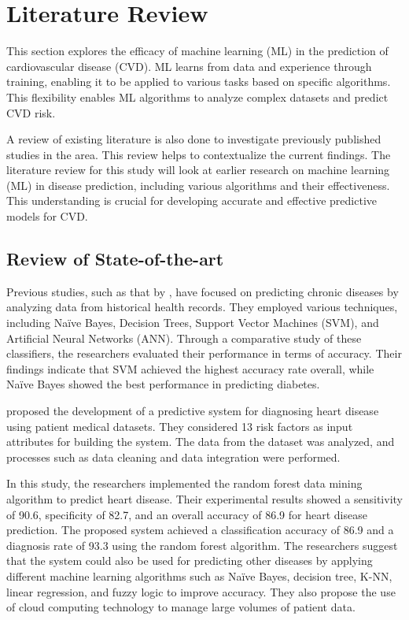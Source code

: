 \chapter{Literature Review}
\label{ch:lit_rev} %

This section explores the efficacy of machine learning (ML) in the prediction of cardiovascular disease (CVD). ML learns from data and experience through training, enabling it to be applied to various tasks based on specific algorithms. This flexibility enables ML algorithms to analyze complex datasets and predict CVD risk.

A review of existing literature is also done to investigate previously published studies in the area. This review  helps to contextualize the current findings. The literature review for this study will look at earlier research on machine learning (ML) in disease prediction, including various algorithms and their effectiveness. This understanding is crucial for developing accurate and effective predictive models for CVD.

\section{Review of State-of-the-art} 
Previous studies, such as that by \cite{seema2016predictive}, have focused on predicting chronic diseases by analyzing data from historical health records. They employed various techniques, including Naïve Bayes, Decision Trees, Support Vector Machines (SVM), and Artificial Neural Networks (ANN). Through a comparative study of these classifiers, the researchers evaluated their performance in terms of accuracy. Their findings indicate that SVM achieved the highest accuracy rate overall, while Naïve Bayes showed the best performance in predicting diabetes.

\cite{shetty2016different} proposed the development of a predictive system for diagnosing heart disease using patient medical datasets. They considered 13 risk factors as input attributes for building the system. The data from the dataset was analyzed, and processes such as data cleaning and data integration were performed.
\

\cite{pal2021prediction}In this study, the researchers implemented the random forest data mining algorithm to predict heart disease. Their experimental results showed a sensitivity of 90.6, specificity of 82.7, and an overall accuracy of 86.9 for heart disease prediction. The proposed system achieved a classification accuracy of 86.9 and a diagnosis rate of 93.3 using the random forest algorithm. The researchers suggest that the system could also be used for predicting other diseases by applying different machine learning algorithms such as Naïve Bayes, decision tree, K-NN, linear regression, and fuzzy logic to improve accuracy. They also propose the use of cloud computing technology to manage large volumes of patient data.

